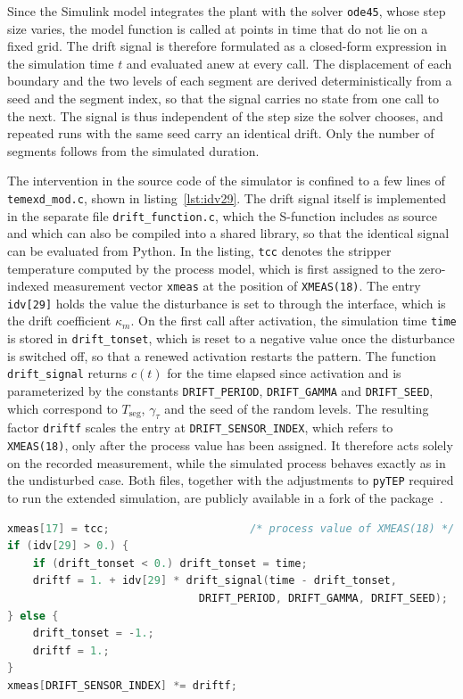 % 
Since the Simulink model integrates the plant with the solver \texttt{ode45}, whose step size varies, the model function is called at points in time that do not lie on a fixed grid. The drift signal is therefore formulated as a closed-form expression in the simulation time $t$ and evaluated anew at every call. The displacement of each boundary and the two levels of each segment are derived deterministically from a seed and the segment index, so that the signal carries no state from one call to the next. The signal is thus independent of the step size the solver chooses, and repeated runs with the same seed carry an identical drift. Only the number of segments follows from the simulated duration. \par
%
%
The intervention in the source code of the simulator is confined to a few lines of \texttt{temexd\_mod.c}, shown in listing~\ref{lst:idv29}. The drift signal itself is implemented in the separate file \texttt{drift\_function.c}, which the S-function includes as source and which can also be compiled into a shared library, so that the identical signal can be evaluated from Python. In the listing, \texttt{tcc} denotes the stripper temperature computed by the process model, which is first assigned to the zero-indexed measurement vector \texttt{xmeas} at the position of \texttt{XMEAS(18)}. The entry \texttt{idv[29]} holds the value the disturbance is set to through the interface, which is the drift coefficient $\kappa_m$. On the first call after activation, the simulation time \texttt{time} is stored in \texttt{drift\_tonset}, which is reset to a negative value once the disturbance is switched off, so that a renewed activation restarts the pattern. The function \texttt{drift\_signal} returns $c(t)$ for the time elapsed since activation and is parameterized by the constants \texttt{DRIFT\_PERIOD}, \texttt{DRIFT\_GAMMA} and \texttt{DRIFT\_SEED}, which correspond to $T_{\mathrm{seg}}$, $\gamma_\tau$ and the seed of the random levels. The resulting factor \texttt{driftf} scales the entry at \texttt{DRIFT\_SENSOR\_INDEX}, which refers to \texttt{XMEAS(18)}, only after the process value has been assigned. It therefore acts solely on the recorded measurement, while the simulated process behaves exactly as in the undisturbed case. Both files, together with the adjustments to \texttt{pyTEP} required to run the extended simulation, are publicly available in a fork of the package~\cite{marijan.2026pytep}. \par
%
\begin{lstlisting}[language=C, float=tb,
    caption={Application of the sensor drift in \texttt{temexd\_mod.c}, abridged and simplified.},
    label={lst:idv29}]
xmeas[17] = tcc;                      /* process value of XMEAS(18) */
if (idv[29] > 0.) {
    if (drift_tonset < 0.) drift_tonset = time;
    driftf = 1. + idv[29] * drift_signal(time - drift_tonset,
                              DRIFT_PERIOD, DRIFT_GAMMA, DRIFT_SEED);
} else {
    drift_tonset = -1.;
    driftf = 1.;
}
xmeas[DRIFT_SENSOR_INDEX] *= driftf;
\end{lstlisting}